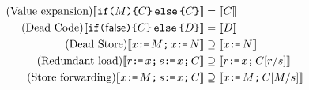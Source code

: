  \begin{align*}
   \tag{Value expansion}
  \sem{\IF{\aExp}\THEN\aCmd\ELSE\aCmd\FI} &=
  \sem{\aCmd}  \\
  \tag{Dead Code} 
  \sem{\IF{\FALSE}\THEN\aCmd\ELSE\bCmd\FI} &=
  \sem{\bCmd} \\
  \tag{Dead Store} 
  \sem{\aLoc \GETS \aExp \SEMI \aLoc  \GETS \bExp} &\supseteq 
  \sem{\aLoc \GETS \bExp}\\    
  \tag{Redundant load}
  \sem{\aReg \GETS \aLoc  \SEMI \bReg \GETS \aLoc  \SEMI \aCmd} &\supseteq
  \sem{\aReg \GETS \aLoc \SEMI \aCmd[\aReg/\bReg]} \\
  \tag{Store forwarding} 
  \sem{\aLoc \GETS \aExp \SEMI \bReg \GETS \aLoc \SEMI \aCmd} &\supseteq 
  \sem{\aLoc \GETS \aExp \SEMI \aCmd[\aExp/\bReg]}
\end{align*}

